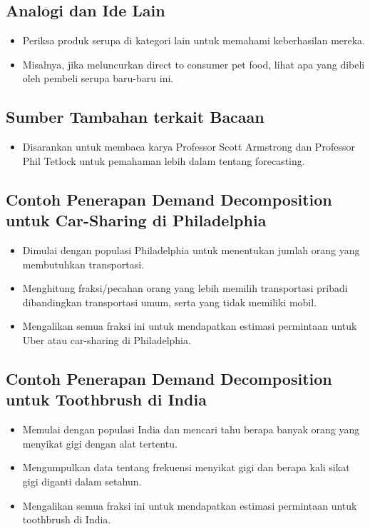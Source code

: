\documentclass{article}
\begin{document}
\subsection{Analogi dan Ide Lain}
\begin{itemize}
    \item Periksa produk serupa di kategori lain untuk memahami keberhasilan mereka.
    \item Misalnya, jika meluncurkan direct to consumer pet food, lihat apa yang dibeli oleh pembeli serupa baru-baru ini.
\end{itemize}

\subsection{Sumber Tambahan terkait Bacaan}
\begin{itemize}
    \item Disarankan untuk membaca karya Professor Scott Armstrong dan Professor Phil Tetlock untuk pemahaman lebih dalam tentang forecasting.
\end{itemize}

\subsection{Contoh Penerapan Demand Decomposition untuk Car-Sharing di Philadelphia}
\begin{itemize}
    \item Dimulai dengan populasi Philadelphia untuk menentukan jumlah orang yang membutuhkan transportasi.
    \item Menghitung fraksi/pecahan orang yang lebih memilih transportasi pribadi dibandingkan transportasi umum, serta yang tidak memiliki mobil.
    \item Mengalikan semua fraksi ini untuk mendapatkan estimasi permintaan untuk Uber atau car-sharing di Philadelphia.
\end{itemize}

\subsection{Contoh Penerapan Demand Decomposition untuk Toothbrush di India}
\begin{itemize}
    \item Memulai dengan populasi India dan mencari tahu berapa banyak orang yang menyikat gigi dengan alat tertentu.
    \item Mengumpulkan data tentang frekuensi menyikat gigi dan berapa kali sikat gigi diganti dalam setahun.
    \item Mengalikan semua fraksi ini untuk mendapatkan estimasi permintaan untuk toothbrush di India.
\end{itemize}
\end{document}
